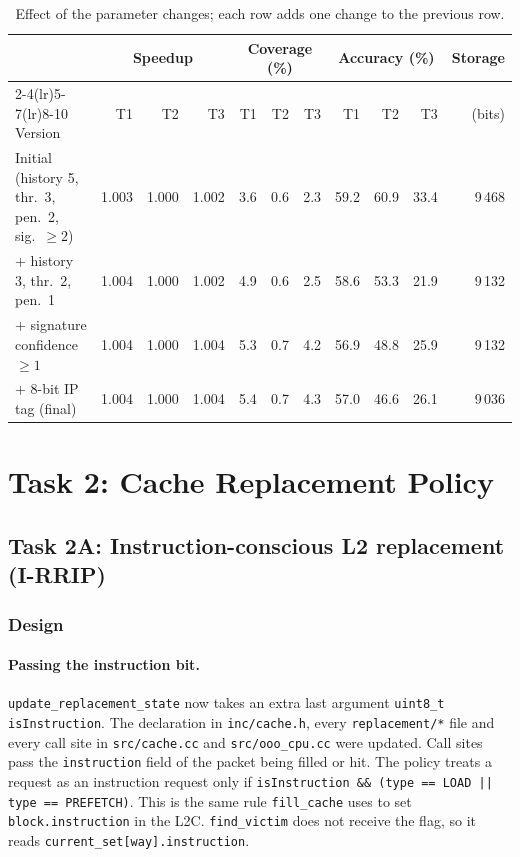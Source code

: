 \documentclass[11pt,a4paper]{article}
\begin{document}
\begin{table}[H]
    \centering
    \small
    \setlength{\tabcolsep}{3pt}
    \begin{tabular}{l rrr rrr rrr r}
        \toprule
        & \multicolumn{3}{c}{Speedup} & \multicolumn{3}{c}{Coverage (\%)} & \multicolumn{3}{c}{Accuracy (\%)} & Storage \\
        \cmidrule(lr){2-4}\cmidrule(lr){5-7}\cmidrule(lr){8-10}
        Version & T1 & T2 & T3 & T1 & T2 & T3 & T1 & T2 & T3 & (bits) \\
        \midrule
        Initial (history 5, thr.\ 3, pen.\ 2, sig.\ $\ge 2$) & 1.003 & 1.000 & 1.002 & 3.6 & 0.6 & 2.3 & 59.2 & 60.9 & 33.4 & 9\,468 \\
        + history 3, thr.\ 2, pen.\ 1        & 1.004 & 1.000 & 1.002 & 4.9 & 0.6 & 2.5 & 58.6 & 53.3 & 21.9 & 9\,132 \\
        + signature confidence $\ge 1$        & 1.004 & 1.000 & 1.004 & 5.3 & 0.7 & 4.2 & 56.9 & 48.8 & 25.9 & 9\,132 \\
        + 8-bit IP tag (final)                & 1.004 & 1.000 & 1.004 & 5.4 & 0.7 & 4.3 & 57.0 & 46.6 & 26.1 & 9\,036 \\
        \bottomrule
    \end{tabular}
    \caption{Effect of the parameter changes; each row adds one change to the previous row.}
    \label{tab:spp-tuning}
\end{table}


\newpage
\section{Task 2: Cache Replacement Policy}

\subsection{Task 2A: Instruction-conscious L2 replacement (I-RRIP)}
\label{sec:task2a}

\subsubsection{Design}

\paragraph{Passing the instruction bit.} \texttt{update\_replacement\_state} now takes an extra last
argument \texttt{uint8\_t isInstruction}. The declaration in \texttt{inc/cache.h}, every
\texttt{replacement/*} file and every call site in \texttt{src/cache.cc} and \texttt{src/ooo\_cpu.cc}
were updated. Call sites pass the \texttt{instruction} field of the packet being filled or hit. \newline
The policy treats a request as an instruction request only if
\texttt{isInstruction \&\& (type == LOAD || type == PREFETCH)}. This is the same rule
\texttt{fill\_cache} uses to set \texttt{block.instruction} in the L2C. \newline
\texttt{find\_victim} does not receive the flag, so
it reads \texttt{current\_set[way].instruction}.
\end{document}
